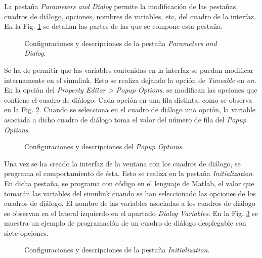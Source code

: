 \documentclass{report}
\begin{document}
La pestaña \textit{Parameters and Dialog} permite la modificación de las pestañas, cuadros de diálogo, opciones, nombres de variables, etc, del cuadro de la interfaz. En la Fig. \ref{fig.mask2} se detallan las partes de las que se compone esta pestaña.

\begin{figure}[!h]
    \begin{center}
    \caption{Configuraciones y descripciones de la pestaña \textit{Parameters and Dialog}.}
    \label{fig.mask2} 
    \end{center}
\end{figure}

Se ha de permitir que las variables contenidas en la interfaz se puedan modificar internamente en el simulink. Esto se realiza dejando la opción de \textit{Tuneable} en \textit{on}.
En la opción del \textit{Property Editor > Popup Options}, se modifican las opciones que contiene el cuadro de diálogo. Cada opción en una fila distinta, como se observa en la Fig. \ref{fig.mask3}. Cuando se selecciona en el cuadro de diálogo una opción, la variable asociada a dicho cuadro de diálogo toma el valor del número de fila del \textit{Popup Options}. 
\begin{figure}[!h]
    \begin{center}
    \caption{Configuraciones y descripciones del \textit{Popup Options}.}
    \label{fig.mask3} 
    \end{center}
\end{figure}

Una vez se ha creado la interfaz de la ventana con los cuadros de diálogo, se programa el comportamiento de ésta. Esto se realiza en la pestaña \textit{Initialization}. En dicha pestaña, se programa con código en el lenguaje de Matlab, el valor que tomarán las variables del simulink cuando se han seleccionado las opciones de los cuadros de diálogo. El nombre de las variables asociadas a los cuadros de diálogo se observan en el lateral izquierdo en el apartado \textit{Dialog Variables}. En la Fig. \ref{fig.mask4} se muestra un ejemplo de programación de un cuadro de diálogo desplegable con siete opciones.

\begin{figure}[!h]
    \begin{center}
    \caption{Configuraciones y descripciones de la pestaña \textit{Initialization}.}
    \label{fig.mask4} 
    \end{center}
\end{figure}
\end{document}
